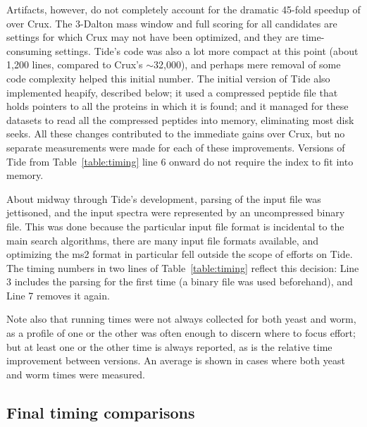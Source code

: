 Artifacts, however, do not completely account for the dramatic 45-fold
speedup of \tidezero over Crux. The 3-Dalton mass window and full
\XCorr scoring for all candidates are settings for which Crux may not
have been optimized, and they are time-consuming settings. Tide's code
was also a lot more compact at this point (about 1,200 lines, compared
to Crux's $\sim$32,000), and perhaps mere removal of some code complexity
helped this initial number. The initial version of Tide also
implemented heapify, described below; it used a compressed peptide
file that holds pointers to all the proteins in which it is found; and
it managed for these datasets to read all the compressed peptides into
memory, eliminating most disk seeks. All these changes contributed to
the immediate gains over Crux, but no separate measurements were made
for each of these improvements. Versions of Tide from
Table~\ref{table:timing} line 6 onward do not require the index to fit
into memory.

About midway through Tide's development, parsing of the input file
was jettisoned, and the input spectra were represented by an
uncompressed binary file. This was done because the particular input
file format is incidental to the main search algorithms, there are
many input file formats available, and optimizing the ms2 format in
particular fell outside the scope of efforts on Tide. The timing
numbers in two lines of \DIFdelbegin {}\DIFdelend Table~\ref{table:timing} reflect this
decision: Line 3 includes the parsing for the first time (a binary
file was used beforehand), and Line 7 removes it again.

\DIFaddbegin {}

\DIFaddend Note also that running times were not always collected for both yeast
and worm, as a profile of one or the other was often enough to discern
where to focus effort; but at least one or the other time is always
reported, as is the relative time improvement between versions. An
average is shown in cases where both yeast and worm times were
measured.

\subsection{Final timing comparisons}

